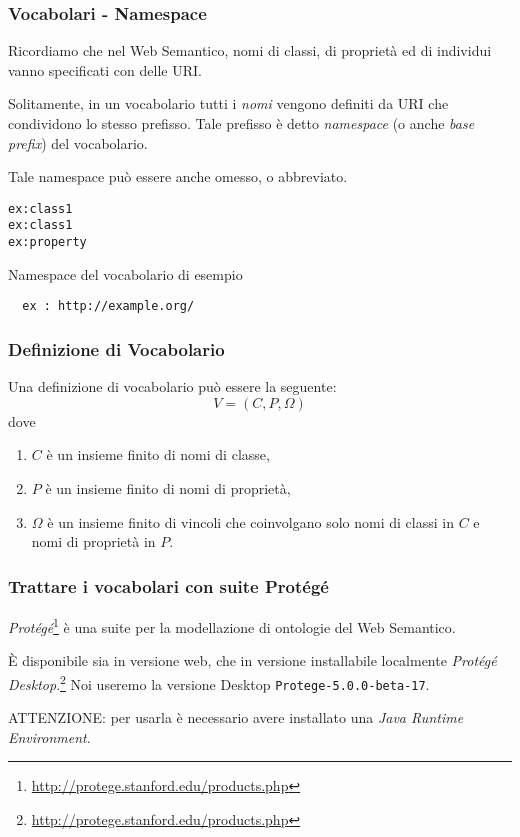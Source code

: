 \documentclass[8pt]{beamer}
\begin{document}
\begin{frame}[fragile]
\frametitle{Vocabolari - Namespace}

Ricordiamo che nel Web Semantico, nomi di classi, di propriet\`a ed di individui
vanno specificati con delle URI.
\vspace{\baselineskip}

Solitamente, in un vocabolario tutti i \emph{nomi} vengono definiti da URI che
condividono lo stesso prefisso. Tale prefisso \`e
detto \emph{namespace} (o anche \emph{base prefix}) del vocabolario.
\vspace{\baselineskip}

Tale namespace pu\`o essere anche omesso,
o abbreviato.

\begin{verbatim}
ex:class1 
ex:class1 
ex:property 
\end{verbatim}
 
Namespace del vocabolario di esempio  
\begin{verbatim}
  ex : http://example.org/ 
\end{verbatim}
\end{frame}

\begin{frame}
\frametitle{Definizione di Vocabolario}
Una definizione di vocabolario pu\`o essere la seguente:
\[
 V = (C, P, \Omega)
\]
dove
\begin{enumerate}
 \item $C$ \`e un insieme finito di nomi di classe,
 \item $P$ \`e un insieme finito di nomi di propriet\`a,
 \item $\Omega$ \`e un insieme finito di vincoli che coinvolgano solo
 nomi di classi in $C$ e nomi di propriet\`a in $P$.
\end{enumerate}
\end{frame}

\begin{frame}
\frametitle{Trattare i vocabolari con suite Prot\'eg\'e}

  \emph{Prot\'eg\'e}\footnote{\url{http://protege.stanford.edu/products.php}} 
  \`e una suite per la modellazione di ontologie del Web Semantico. 
  \vspace{\baselineskip}

  \`E disponibile sia in versione web, che in versione installabile 
  localmente \emph{Prot\'eg\'e Desktop}.\footnote{\url{http://protege.stanford.edu/products.php}} 
  Noi useremo la versione Desktop \texttt{Protege-5.0.0-beta-17}.
  
  ATTENZIONE: per usarla \`e necessario avere installato una \emph{Java Runtime Environment}.
  \vspace{\baselineskip} 
\end{frame}
\end{document}
